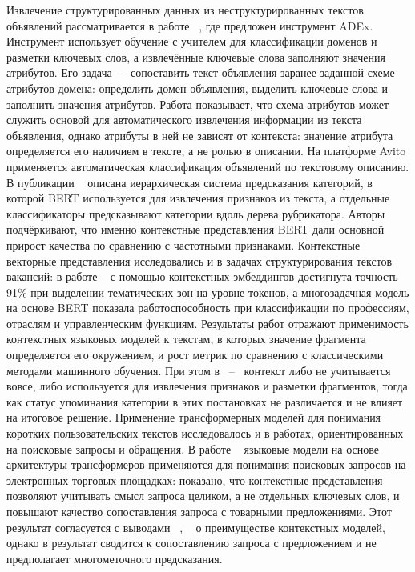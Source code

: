 \documentclass{misisarticle}
\begin{document}
Извлечение структурированных данных из неструктурированных текстов объявлений рассматривается в работе ~\cite{st_adex}, где предложен инструмент ADEx. Инструмент использует обучение с учителем для классификации доменов и разметки ключевых слов, а извлечённые ключевые слова заполняют значения атрибутов. Его задача — сопоставить текст объявления заранее заданной схеме атрибутов домена: определить домен объявления, выделить ключевые слова и заполнить значения атрибутов. Работа показывает, что схема атрибутов может служить основой для автоматического извлечения информации из текста объявления, однако атрибуты в ней не зависят от контекста: значение атрибута определяется его наличием в тексте, а не ролью в описании. На платформе Avito применяется автоматическая классификация объявлений по текстовому описанию. В публикации ~\cite{avitotech} описана иерархическая система предсказания категорий, в которой BERT используется для извлечения признаков из текста, а отдельные классификаторы предсказывают категории вдоль дерева рубрикатора. Авторы подчёркивают, что именно контекстные представления BERT дали основной прирост качества по сравнению с частотными признаками. Контекстные векторные представления исследовались и в задачах структурирования текстов вакансий: в работе ~\cite{st_vak1} с помощью контекстных эмбеддингов достигнута точность 91\% при выделении тематических зон на уровне токенов, а многозадачная модель на основе BERT показала работоспособность при классификации по профессиям, отраслям и управленческим функциям. Результаты работ отражают применимость контекстных языковых моделей к текстам, в которых значение фрагмента определяется его окружением, и рост метрик по сравнению с классическими методами машинного обучения. При этом в ~\cite{st_adex}–~\cite{st_vak1} контекст либо не учитывается вовсе, либо используется для извлечения признаков и разметки фрагментов, тогда как статус упоминания категории в этих постановках не различается и не влияет на итоговое решение. Применение трансформерных моделей для понимания коротких пользовательских текстов исследовалось и в работах, ориентированных на поисковые запросы и обращения. В работе ~\cite{krasnov} языковые модели на основе архитектуры трансформеров применяются для понимания поисковых запросов на электронных торговых площадках: показано, что контекстные представления позволяют учитывать смысл запроса целиком, а не отдельных ключевых слов, и повышают качество сопоставления запроса с товарными предложениями. Этот результат согласуется с выводами ~\cite{avitotech}, ~\cite{st_vak1} о преимуществе контекстных моделей, однако в \cite{krasnov} результат сводится к сопоставлению запроса с предложением и не предполагает многометочного предсказания.
\end{document}
